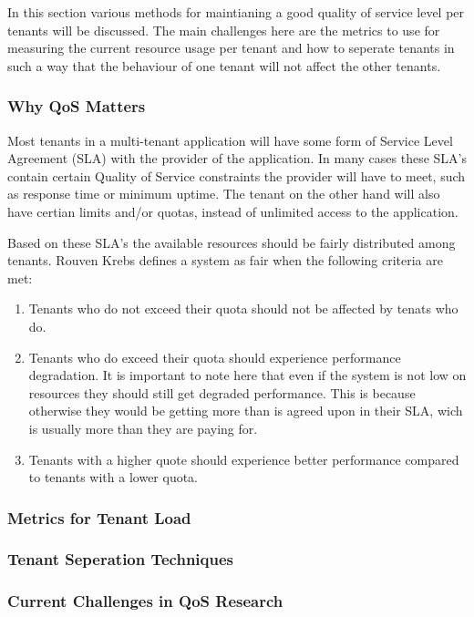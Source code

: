 In this section various methods for maintianing a good quality of service level per tenants will be discussed.
The main challenges here are the metrics to use for measuring the current resource usage per tenant and how to seperate tenants in such a way that the behaviour of one tenant will not affect the other tenants.\cite{krebs2013metrics}

\subsubsection{Why QoS Matters}
Most tenants in a multi-tenant application will have some form of Service Level Agreement (SLA) with the provider of the application.
In many cases these SLA's contain certain Quality of Service constraints the provider will have to meet, such as response time or minimum uptime. 
The tenant on the other hand will also have certian limits and/or quotas, instead of unlimited access to the application.

Based on these SLA's the available resources should be fairly distributed among tenants.
Rouven Krebs\cite{krebs2013metrics} defines a system as fair when the following criteria are met:
\begin{enumerate}
	\item Tenants who do not exceed their quota should not be affected by tenats who do.
	\item Tenants who do exceed their quota should experience performance degradation. 
		It is important to note here that even if the system is not low on resources they should still get degraded performance.
		This is because otherwise they would be getting more than is agreed upon in their SLA, wich is usually more than they are paying for.
	\item Tenants with a higher quote should experience better performance compared to tenants with a lower quota.
\end{enumerate}

\subsubsection{Metrics for Tenant Load}

\subsubsection{Tenant Seperation Techniques}

\subsubsection{Current Challenges in QoS Research}
